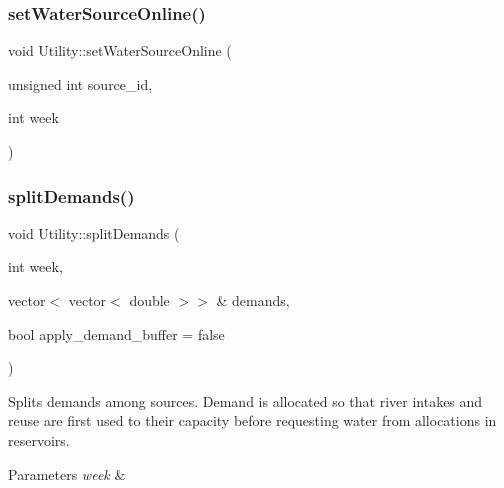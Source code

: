 \mbox{\label{classUtility_ae01127adf3c99415310e77b22bd9f3b5}} 
\subsubsection{\texorpdfstring{set\+Water\+Source\+Online()}{setWaterSourceOnline()}}
{\footnotesize\ttfamily void Utility\+::set\+Water\+Source\+Online (\begin{DoxyParamCaption}\item[{unsigned int}]{source\+\_\+id,  }\item[{int}]{week }\end{DoxyParamCaption})}

\mbox{\label{classUtility_ab578bbe9f346692d9251418f20fd2345}} 
\subsubsection{\texorpdfstring{split\+Demands()}{splitDemands()}}
{\footnotesize\ttfamily void Utility\+::split\+Demands (\begin{DoxyParamCaption}\item[{int}]{week,  }\item[{vector$<$ vector$<$ double $>$$>$ \&}]{demands,  }\item[{bool}]{apply\+\_\+demand\+\_\+buffer = {\ttfamily false} }\end{DoxyParamCaption})}

Splits demands among sources. Demand is allocated so that river intakes and reuse are first used to their capacity before requesting water from allocations in reservoirs. 
\begin{DoxyParams}{Parameters}
{\em week} & \\
\hline
\end{DoxyParams}
\mbox{\label{classUtility_ab663efd526505a3d843cae7075cc3b91}} 
